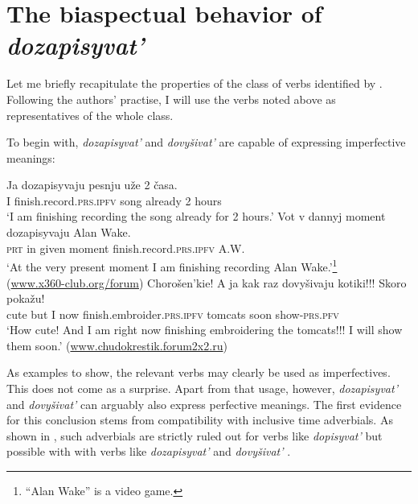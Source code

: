 \documentclass[output=paper,
colorlinks,
citecolor=brown,
newtxmath
]{langscibook}
\begin{document}

\section{The biaspectual behavior of \textit{dozapisyvat'}}\label{sec2}

Let me briefly recapitulate the properties of the class of verbs identified by \citet{Zinova.Filip2015}. Following the authors' practise, I will use the verbs noted above as representatives of the whole class.

To begin with, \textit{dozapisyvat'} and \textit{dovyšivat'} are capable of expressing imperfective meanings:

\ea\label{songpfin1}
\gll Ja dozapisyvaju pesnju uže 2 časa.\\
I {finish.record.}\textsc{prs.ipfv} song already 2 hours\\
\glt `I am finishing recording the song already for 2 hours.' \hfill \citep[16]{Zinova2016}
\ex\label{songipf2}
\gll Vot v dannyj moment dozapisyvaju {Alan Wake}.\\
 \textsc{prt} in given moment {finish.record.}\textsc{prs.ipfv} A.W.\\
\glt `At the very present moment I am finishing recording Alan Wake.'\footnote{``Alan Wake'' is a video game.}  \\ \hfill (\url{www.x360-club.org/forum})
\ex\label{kotiki}
\gll Chorošen'kie! A ja {kak raz} dovyšivaju kotiki!!! Skoro pokažu!\\
 cute but I now {finish.embroider.}\textsc{prs.ipfv} tomcats
 soon show-\textsc{prs.pfv}\\
\glt `How cute! And I am right now finishing embroidering the tomcats!!! I will show them soon.' \hfill (\url{www.chudokrestik.forum2x2.ru})
\z

\noindent As examples  to  show, the relevant verbs may clearly be used as imperfectives. This does not come as a surprise. Apart from that usage, however, \textit{dozapisyvat'} and \textit{dovyšivat'} can arguably also express perfective meanings. The first evidence for this conclusion stems from compatibility with inclusive time adverbials. As shown in \citet[16]{Zinova2016}, such adverbials are strictly ruled out for verbs like \textit{dopisyvat'}  but possible with with verbs like \textit{dozapisyvat'}  and \textit{dovyšivat'} .
\end{document}

